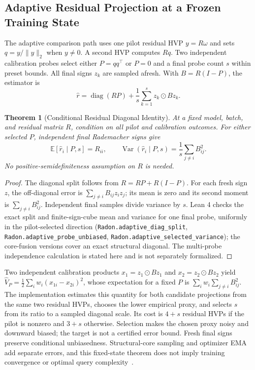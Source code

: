 \documentclass[11pt,a4paper]{article}
\newtheorem{theorem}{Theorem}
\theoremstyle{definition}
\theoremstyle{remark}
\begin{document}
\subsection{Adaptive Residual Projection at a Frozen Training State}

The adaptive comparison path uses one pilot residual HVP $y=R\omega$ and sets $q=y/\|y\|_2$ when $y\ne0$. A second HVP computes $Rq$. Two independent calibration probes select either $P=qq^\top$ or $P=0$ and a final probe count $s$ within preset bounds. All final signs $z_k$ are sampled afresh. With $B=R(I-P)$, the estimator is
\begin{equation}
\hat r = \operatorname{diag}(RP)+\frac{1}{s}\sum_{k=1}^{s}z_k\odot Bz_k.
\end{equation}
\begin{theorem}[Conditional Residual Diagonal Identity]
At a fixed model, batch, and residual matrix $R$, condition on all pilot and calibration outcomes. For either selected $P$, independent final Rademacher signs give
\begin{equation}
\mathbb E[\hat r_i\mid P,s]=R_{ii},\qquad
\operatorname{Var}(\hat r_i\mid P,s)=\frac{1}{s}\sum_{j\ne i}B_{ij}^{2}.
\end{equation}
No positive-semidefiniteness assumption on $R$ is needed.
\end{theorem}
\begin{proof}
The diagonal split follows from $R=RP+R(I-P)$. For each fresh sign $z$, the off-diagonal error is $\sum_{j\ne i} B_{ij}z_i z_j$; its mean is zero and its second moment is $\sum_{j\ne i}B_{ij}^2$. Independent final samples divide variance by $s$. Lean 4 checks the exact split and finite-sign-cube mean and variance for one final probe, uniformly in the pilot-selected direction (\texttt{Radon.adaptive\_diag\_split}, \texttt{Radon.adaptive\_probe\_unbiased}, \texttt{Radon.adaptive\_selected\_variance}); the core-fusion versions cover an exact structural diagonal. The multi-probe independence calculation is stated here and is not separately formalized.
\end{proof}

Two independent calibration products $x_1=z_1\odot Bz_1$ and $x_2=z_2\odot Bz_2$ yield $\hat V_P=\frac12\sum_i w_i(x_{1i}-x_{2i})^2$, whose expectation for a fixed $P$ is $\sum_i w_i\sum_{j\ne i}B_{ij}^2$. The implementation estimates this quantity for both candidate projections from the same two residual HVPs, chooses the lower empirical proxy, and selects $s$ from its ratio to a sampled diagonal scale. Its cost is $4+s$ residual HVPs if the pilot is nonzero and $3+s$ otherwise. Selection makes the chosen proxy noisy and downward biased; the target is not a certified error bound. Fresh final signs preserve conditional unbiasedness. Structural-core sampling and optimizer EMA add separate errors, and this fixed-state theorem does not imply training convergence or optimal query complexity~\cite{baston2022stochastic,han2024adaptive}.
\end{document}
